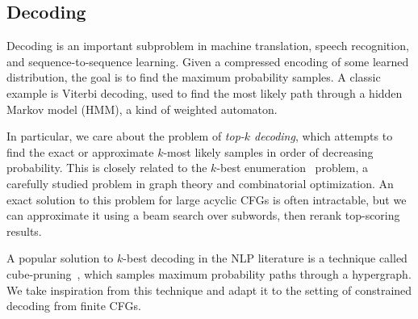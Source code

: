\documentclass[popl.tex]{subfiles}
\begin{document}
%

\subsection{Decoding}\label{sec:decoding}

Decoding is an important subproblem in machine translation, speech recognition, and sequence-to-sequence learning. Given a compressed encoding of some learned distribution, the goal is to find the maximum probability samples. A classic example is Viterbi decoding, used to find the most likely path through a hidden Markov model (HMM), a kind of weighted automaton.

In particular, we care about the problem of \textit{top-$k$ decoding}, which attempts to find the exact or approximate $k$-most likely samples in order of decreasing probability. This is closely related to the $k$-best enumeration~\cite{eppstein2014k} problem, a carefully studied problem in graph theory and combinatorial optimization. An exact solution to this problem for large acyclic CFGs is often intractable, but we can approximate it using a beam search over subwords, then rerank top-scoring results.

A popular solution to $k$-best decoding in the NLP literature is a technique called cube-pruning~\cite{huang2005better, chiang2007hierarchical}, which samples maximum probability paths through a hypergraph. We take inspiration from this technique and adapt it to the setting of constrained decoding from finite CFGs.
\end{document}
